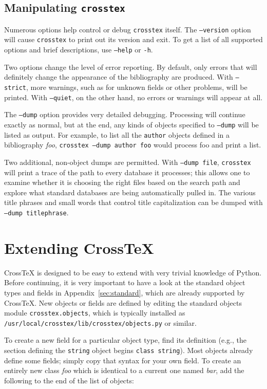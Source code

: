 \documentclass{article}
\newcommand{\XTX}{Cross\TeX}
\begin{document}
\subsection{Manipulating \texttt{crosstex}}

Numerous options help control or debug \texttt{crosstex} itself.  The
\texttt{--version} option will cause \texttt{crosstex} to print out its
version and exit.  To get a list of all supported options and brief
descriptions, use \texttt{--help} or \texttt{-h}.

Two options change the level of error reporting.  By default, only
errors that will definitely change the appearance of the bibliography
are produced.  With \texttt{--strict}, more warnings, such as for unknown
fields or other problems, will be printed.  With \texttt{--quiet}, on the
other hand, no errors or warnings will appear at all.

The \texttt{--dump} option provides very detailed debugging.  Processing
will continue exactly as normal, but at the end, any kinds of objects
specified to \texttt{--dump} will be listed as output.  For example, to
list all the \texttt{author} objects defined in a bibliography \textit{foo},
\texttt{crosstex --dump author foo} would process foo and print a list.

Two additional, non-object dumps are permitted.  With \texttt{--dump~file},
\texttt{crosstex} will print a trace of the path to every database it
processes; this allows one to examine whether it is choosing the right files
based on the search path and explore what standard databases are being
automatically pulled in.  The various title phrases and small words that
control title capitalization can be dumped with \texttt{--dump~titlephrase}.


\section{Extending \XTX{}\label{sec:extending}}

\XTX{} is designed to be easy to extend with very trivial knowledge of
Python. Before continuing, it is very important to have a look at the
standard object types and fields in Appendix~\ref{sec:standard}, which are
already supported by \XTX{}. New objects or fields are defined by editing
the standard objects module \texttt{crosstex.objects}, which is typically
installed as \texttt{/usr/local/crosstex/lib/crosstex/objects.py}
or similar.

To create a new field for a particular object type, find its definition
(e.g., the section defining the \texttt{string} object begins
\texttt{class string}). Most objects already define some fields;
simply copy that syntax for your own field.  To create an entirely new class \textit{foo} which is identical to
a current one named \textit{bar}, add the following to the end of the list of objects:
\end{document}
